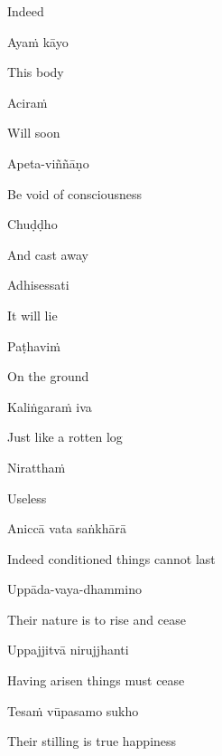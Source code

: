 \begin{english}
  Indeed
\end{english}

Ayaṁ kāyo

\begin{english}
  This body
\end{english}

Aciraṁ

\begin{english}
  Will soon
\end{english}

Apeta-viññāṇo

\begin{english}
  Be void of consciousness
\end{english}

Chuḍḍho

\begin{english}
  And cast away
\end{english}

Adhisessati

\begin{english}
  It will lie
\end{english}

Paṭhaviṁ

\begin{english}
  On the ground
\end{english}

Kaliṅgaraṁ iva

\begin{english}
  Just like a rotten log
\end{english}

Niratthaṁ

\begin{english}
  Useless\makeatletter\hyperlink{endnote105-appendix}\makeatother
\end{english}

\suttaRef{[Dhp 41]}

Aniccā vata saṅkhārā

\begin{english}
  Indeed conditioned things cannot last
\end{english}

Uppāda-vaya-dhammino

\begin{english}
  Their nature is to rise and cease\makeatletter\hyperlink{endnote106-appendix}\makeatother
\end{english}

Uppajjitvā nirujjhanti

\begin{english}
  Having arisen things must cease
\end{english}

Tesaṁ vūpasamo sukho

\begin{english}
  Their stilling is true happiness
\end{english}

\suttaRef{[Trad]}

